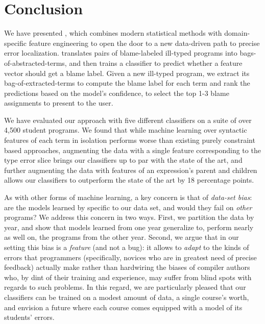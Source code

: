 \section{Conclusion}
\label{sec:conclusion}

We have presented \toolname, which
combines modern statistical methods
with domain-specific feature engineering
to open the door to a new data-driven
path to precise error localization.
%
\toolname
translates pairs of
blame-labeled ill-typed
programs into bags-of-abstracted-terms,
and then trains a classifier
to predict whether a feature vector
should get a blame label.
%
Given a new ill-typed program,
we extract its bag-of-extracted-terms
to compute the blame label for each
term and rank the predictions based
on the model's confidence, to select
the top 1-3 blame assignments to
present to the user.

We have evaluated our approach with
five different classifiers on a suite
of over 4,500 student programs.
%
We found that while machine learning
over syntactic features of each term in isolation
performs worse than existing
purely constraint based approaches, %
augmenting the data with a single feature corresponding to
the type error slice brings our
classifiers up to par with the state of the art,
and further augmenting the data with
features of an expression's parent and children
allows our classifiers to outperform
the state of the art by 18 percentage points.



As with other forms of machine learning,
a key concern is that of \emph{data-set bias}: are
the models learned by \toolname specific
to our data set, and would they fail on
\emph{other} \ocaml programs?
%
We address this concern in two ways.
%
First, we partition the data by year,
and show that models learned from one
year generalize to, \ie perform nearly
as well on, the programs from the other
year.
%
Second, we argue that in our setting
this bias is a \emph{feature} (and not
a bug): it allows \toolname to \emph{adapt}
to the kinds of errors that programmers
(specifically, novices who are in greatest
need of precise feedback) actually make
rather than hardwiring the biases of
compiler authors who, by dint of their
training and experience, may suffer from
blind spots with regards to such problems.
%
In this regard, we are particularly pleased
that our classifiers can be trained on a
modest amount of data, \ie a single course's
worth, and envision a future where each course
comes equipped with a model of its students' errors.



